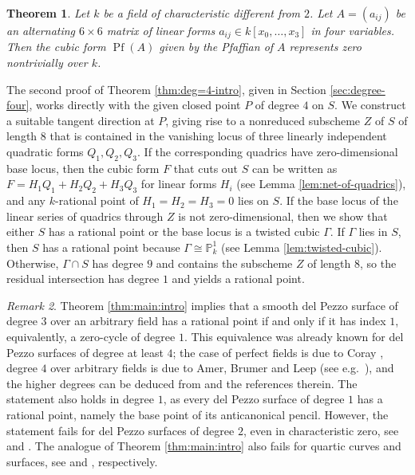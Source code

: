 \documentclass[a4paper,11pt]{amsart}
\numberwithin{equation}{section}
\newtheorem{theorem}{Theorem}[section]
\theoremstyle{definition}
\theoremstyle{remark}
\newtheorem{remark}[theorem]{Remark}
\newcommand{\PP}{\mathbb P}
\newcommand{\CP}{\PP}
\begin{document}
\begin{theorem}\label{thm:pfaffian-intro}
Let $k$ be a field of characteristic different from $2$.
Let $A=(a_{ij})$ be an alternating $6\times 6$ matrix of linear forms $a_{ij}\in k[x_0,\dots ,x_3]$ in four variables.
Then the cubic form $\operatorname{Pf} (A)$ given by the Pfaffian of $A$ represents zero nontrivially over $k$.
%
\end{theorem}



The second proof of Theorem \ref{thm:deg=4-intro}, given in Section \ref{sec:degree-four}, works directly with the given closed point $P$ of degree $4$ on $S$. We construct a suitable tangent direction at $P$, giving rise to a nonreduced subscheme $Z$ of $S$ of length $8$ that is contained in the vanishing locus of three linearly independent quadratic forms $Q_1,Q_2,Q_3$.
If the corresponding quadrics have zero-dimensional base locus, then the cubic form $F$ that cuts out $S$ can be written as $F=H_1Q_1+H_2Q_2+H_3Q_3$ for linear forms $H_i$ (see Lemma \ref{lem:net-of-quadrics}), and any $k$-rational point of ${H_1=H_2=H_3=0}$ lies on $S$.
If the base locus of the linear series of quadrics through $Z$ is not zero-dimensional, then we show that either $S$ has a rational point or the base locus is a twisted cubic $\Gamma$.
If $\Gamma$ lies in $S$, then $S$ has a rational point because $\Gamma\cong \CP^1_k$ (see Lemma \ref{lem:twisted-cubic}).
Otherwise, $\Gamma\cap S$ has degree $9$ and contains the subscheme $Z$ of length $8$, so the residual intersection has degree $1$ and yields a rational point.

\begin{remark} \label{rem:delPezzo}
Theorem \ref{thm:main:intro} implies that a smooth del Pezzo surface of degree $3$ over an arbitrary field has a rational point if and only if it has index $1$, equivalently, a zero-cycle of degree $1$.
This equivalence was already known for del Pezzo surfaces of degree at least $4$; the case of perfect fields is due to Coray \cite{coray2}, degree $4$ over arbitrary fields is due to Amer, Brumer and Leep (see e.g.~\cite[Corollary 18.7]{EKM}), and the higher degrees can be deduced from \cite[\S6--\S10]{AB} and the references therein.  
The statement also holds in degree $1$, as every del Pezzo surface of degree $1$ has a rational point, namely the base point of its anticanonical pencil. 
However, the statement fails for del Pezzo surfaces of degree $2$, even in characteristic zero, see \cite{KM17} and \cite[Remarque~4.3]{CT-zero-cycles}.
The analogue of Theorem \ref{thm:main:intro} also fails for quartic curves and surfaces, see \cite[Example 2.8]{coray} and \cite{BN}, respectively.  
\end{remark}
\end{document}

